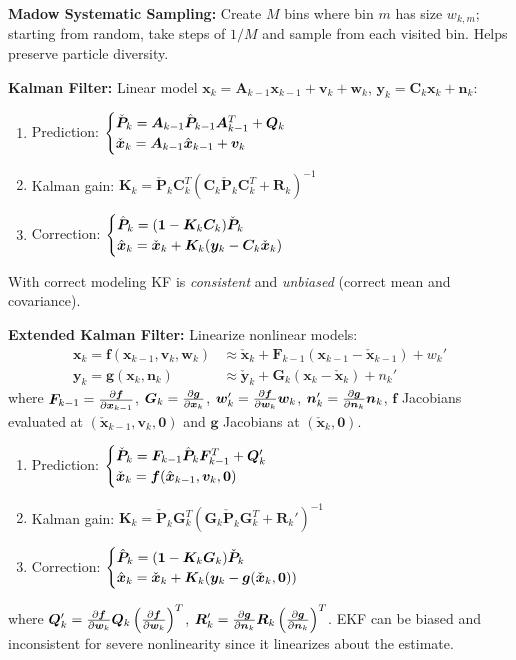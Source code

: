 \documentclass[twocolumn, 8pt]{extarticle}
\begin{document}
\textbf{Madow Systematic Sampling:} Create $M$ bins where bin $m$ has size $w_{k, m}$; starting from random, take steps
of $1/M$ and sample from each visited bin. Helps preserve particle diversity.

\textbf{Kalman Filter:} Linear model \(\bm x_k = \bm A_{k - 1}\bm x_{k - 1} + \bm v_k + \bm w_k\), \(\bm y_k = \bm C_k\bm x_k + \bm n_k\):
\begin{enumerate}
  \item Prediction: $\begin{cases} {\check{\bm P}_k = \bm A_{k - 1}\hat{\bm P}_{k - 1}\bm A_{k - 1}^T + \bm Q_k} \\ {\check{\bm x}_k = \bm A_{k - 1}\hat{\bm x}_{k - 1} + \bm v_k} \end{cases}$
  \item Kalman gain: $\bm K_k = \check{\bm P}_k\bm C_k^T(\bm C_k\check{\bm P}_k\bm C_k^T + \bm R_k)^{-1}$
  \item Correction: $\begin{cases} {\hat{\bm P}_k = (\bm 1 - \bm K_k\bm C_k)\check{\bm P}_k} \\ {\hat{\bm x}_k = \check{\bm x}_k + \bm K_k(\bm y_k - \bm C_k\check{\bm x}_k)} \end{cases}$
\end{enumerate}
With correct modeling KF is \emph{consistent} and \emph{unbiased} (correct mean and covariance).

\textbf{Extended Kalman Filter:} Linearize nonlinear models:
\begin{align*}
  \bm x_k = \bm f(\bm x_{k - 1}, \bm v_k, \bm w_k) &\approx \check{\bm x}_k + \bm F_{k - 1}(\bm x_{k - 1} - \check{\bm x}_{k - 1}) + w_k' \\
  \bm y_k = \bm g(\bm x_k, \bm n_k) &\approx \check{\bm y}_k + \bm G_k(\bm x_k - \check{\bm x}_k) + n_k'
\end{align*}
where \(\bm F_{k - 1} = \frac{\partial\bm f}{\partial\bm x_{k - 1}}\), 
\(\bm G_k = \frac{\partial\bm g}{\partial\bm x_k}\),
\(\bm w_k' = \frac{\partial\bm f}{\partial\bm w_k}\bm w_k\), \(\bm n_k' = \frac{\partial\bm g}{\partial\bm n_k}\bm n_k\),
\(\bm f\) Jacobians evaluated at \((\check{\bm x}_{k - 1}, \bm v_k, \bm 0)\) and \(\bm g\) Jacobians at \((\check{\bm x}_k, \bm 0)\).
\begin{enumerate}
  \item Prediction: $\begin{cases} {\check{\bm P}_k = \bm F_{k - 1}\hat{\bm P}_k\bm F_{k - 1}^T + \bm Q_k'} \\ {\check{\bm x}_k = \bm f(\hat{\bm x}_{k - 1}, \bm v_k, \bm 0)} \end{cases}$
  \item Kalman gain: $\bm K_k = \check{\bm P}_k\bm G_k^T(\bm G_k\check{\bm P}_k\bm G_k^T + \bm R_k')^{-1}$
  \item Correction: $\begin{cases} {\hat{\bm P}_k = (\bm 1 - \bm K_k\bm G_k)\check{\bm P}_k} \\ {\hat{\bm x}_k = \check{\bm x}_k + \bm K_k(\bm y_k - \bm g(\check{\bm x}_k, \bm 0))} \end{cases}$
\end{enumerate}
where \(\bm Q_k' = \frac{\partial\bm f}{\partial\bm w_k}\bm Q_k\left(\frac{\partial\bm f}{\partial\bm w_k}\right)^T\),
\(\bm R_k' = \frac{\partial\bm g}{\partial\bm n_k}\bm R_k\left(\frac{\partial\bm g}{\partial\bm n_k}\right)^T\).
EKF can be biased and inconsistent for severe nonlinearity since it linearizes about the estimate.
\end{document}
